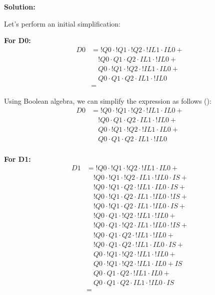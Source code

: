 \textbf{Solution:}

\noindent
Let's perform an initial simplification:

\textbf{For D0:}
\begin{align*}
    D0 &= !Q0 \cdot !Q1 \cdot !Q2 \cdot !IL1 \cdot IL0 + \\
       &\quad !Q0 \cdot Q1 \cdot Q2 \cdot IL1 \cdot !IL0 + \\
       &\quad Q0 \cdot !Q1 \cdot !Q2 \cdot !IL1 \cdot IL0 + \\
       &\quad Q0 \cdot Q1 \cdot Q2 \cdot IL1 \cdot !IL0 \\
       &= 
\end{align*}

\noindent
Using Boolean algebra, we can simplify the expression as follows (\cite{boolean-algebra}):
\begin{align*}
    D0 &= !Q0 \cdot !Q1 \cdot !Q2 \cdot !IL1 \cdot IL0 + \\
       &\quad !Q0 \cdot Q1 \cdot Q2 \cdot IL1 \cdot !IL0 + \\
       &\quad Q0 \cdot !Q1 \cdot !Q2 \cdot !IL1 \cdot IL0 + \\
       &\quad Q0 \cdot Q1 \cdot Q2 \cdot IL1 \cdot !IL0 \\
\end{align*}


\textbf{For D1:}
\begin{align*}
    D1 &= !Q0 \cdot !Q1 \cdot !Q2 \cdot !IL1 \cdot IL0 + \\
       &\quad !Q0 \cdot !Q1 \cdot !Q2 \cdot IL1 \cdot !IL0 \cdot IS + \\
       &\quad !Q0 \cdot !Q1 \cdot Q2 \cdot !IL1 \cdot IL0 \cdot IS + \\
       &\quad !Q0 \cdot !Q1 \cdot Q2 \cdot IL1 \cdot !IL0 \cdot !IS + \\
       &\quad !Q0 \cdot !Q1 \cdot Q2 \cdot IL1 \cdot !IL0 \cdot IS + \\
       &\quad !Q0 \cdot Q1 \cdot !Q2 \cdot !IL1 \cdot !IL0 + \\
       &\quad !Q0 \cdot Q1 \cdot !Q2 \cdot IL1 \cdot !IL0 \cdot !IS + \\
       &\quad !Q0 \cdot Q1 \cdot Q2 \cdot !IL1 \cdot !IL0+ \\
       &\quad !Q0 \cdot Q1 \cdot Q2 \cdot !IL1 \cdot IL0 \cdot IS + \\
       &\quad Q0 \cdot !Q1 \cdot !Q2 \cdot !IL1 \cdot !IL0 + \\
       &\quad Q0 \cdot !Q1 \cdot !Q2 \cdot !IL1 \cdot IL0 + IS \\
       &\quad Q0 \cdot Q1 \cdot Q2 \cdot !IL1 \cdot IL0 + \\
       &\quad Q0 \cdot Q1 \cdot Q2 \cdot IL1 \cdot !IL0 \cdot IS \\
    &= 
\end{align*}

